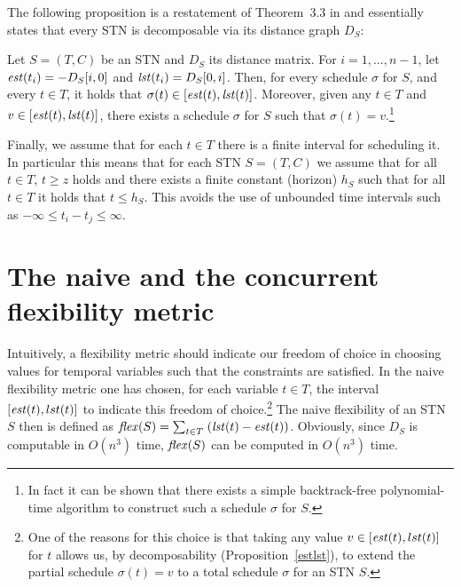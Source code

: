 The following proposition is a restatement of Theorem~3.3 in \cite{dechter1991} and essentially states that every STN is decomposable via its distance graph $D_S$:
\begin{proposition}\label{estlst}
Let $S = (T, C)$ be an STN and $D_S$ its distance matrix. For $i=1, \ldots, n-1$, let $\mathit{est}(t_i) = -D_S[i,0]$ and $\mathit{lst}(t_i) = D_S[0,i]$.
Then, for every schedule $\sigma$ for $S$, and every $t \in T$, it holds that $\sigma(t) \in [\mathit{est}(t), \mathit{lst}(t)]$.
Moreover, given any $t \in T$ and $v \in [\mathit{est}(t), \mathit{lst}(t)]$, there exists a schedule $\sigma$ for $S$ such that $\sigma(t) = v$.\footnote{In fact it can be shown that there exists a simple backtrack-free polynomial-time algorithm to construct such a schedule $\sigma$ for $S$.}
\end{proposition}
Finally, we assume that for each $t \in T$ there is a finite interval for scheduling it. In particular this means that for each STN $S = (T, C)$ we assume that for all $t \in T$, $t \geq z$ holds and there exists a finite constant (horizon) $h_{S}$ such that for all $t \in T$ it holds that $t \leq h_{S}$. This avoids the use of unbounded time intervals such as $-\infty \leq t_i - t_j \leq \infty$.

\section{The naive and the concurrent flexibility metric}

Intuitively, a flexibility metric should indicate our freedom of choice in choosing values for temporal variables such that  the constraints are satisfied. In the naive flexibility metric one has chosen, for each variable $t \in T$, the interval $[\mathit{est}(t), lst(t)]$ to indicate this freedom of choice.\footnote{One of the reasons for this choice is that taking any value $v \in [\mathit{est}(t), lst(t)]$ for $t$ allows us, by decomposability (Proposition~\ref{estlst}), to extend the partial schedule $\sigma(t)=v$ to a total schedule $\sigma$ for an STN $S$.}
The naive flexibility of an STN $S$ then is defined as $\mathit{flex}(S) = \sum_{t \in T}\; (\mathit{lst}(t) - \mathit{est}(t))$. 
Obviously, since $D_S$ is computable in $O(n^3)$ time, $\mathit{flex}(S)$ can be computed in $O(n^3)$ time. 

